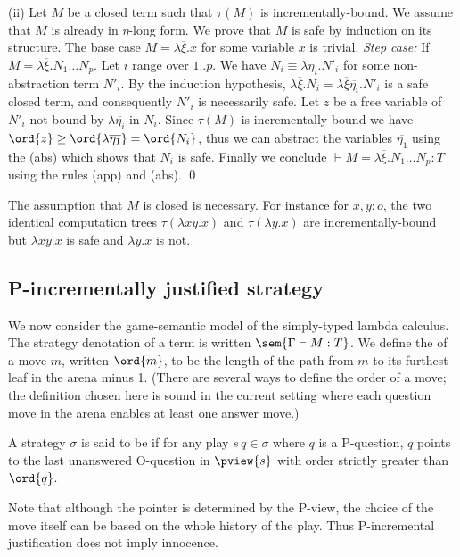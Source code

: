 (ii) Let $M$ be a closed term such that $\tau(M)$ is
incrementally-bound.  We assume that $M$ is already in $\eta$-long
form.  We prove that $M$ is safe by induction on its structure. The
base case $M = \lambda \overline{\xi} . x$ for some variable $x$ is
trivial.  \emph{Step case:} If $M = \lambda \overline{\xi} . N_1
\ldots N_p$.  Let $i$ range over $1..p$. We have $N_i \equiv \lambda
\overline{\eta_i} . N'_i$ for some non-abstraction term $N'_i$. By
the induction hypothesis, $\lambda \overline{\xi} . N_i = \lambda
\overline{\xi} \overline{\eta_i} . N'_i$ is a safe closed term, and
consequently $N'_i$ is necessarily safe. Let $z$ be a free variable
of $N'_i$ not bound by $\lambda \overline{\eta_i}$ in $N_i$. Since
$\tau(M)$ is incrementally-bound we have $\ord{z} \geq \ord{\lambda
  \overline{\eta_1}} = \ord{N_i}$, thus we can abstract the variables $\overline{\eta_1}$ using the {\sf (abs)} which shows that $N_i$ is safe.  Finally
we conclude $\vdash M = \lambda \overline{\xi} . N_1 \ldots N_p : T$
using the rules {\sf (app)} and {\sf (abs)}.  \qed



The assumption that $M$ is closed is necessary. For instance for
$x,y:o$, the two identical computation trees $\tau(\lambda x y .x)$
and $\tau(\lambda y . x)$ are incrementally-bound but $\lambda x y
.x$ is safe and $\lambda y . x$ is not.

\subsection*{P-incrementally justified strategy}

We now consider the game-semantic model of the simply-typed lambda
calculus. The strategy denotation of a term is written $\sem{\Gamma
\vdash M : T}$. We define the  of a move $m$, written
$\ord{m}$, to be the length of the path from $m$ to its furthest
leaf in the arena minus 1. (There are several ways to define the
order of a move; the definition chosen here is sound in the current
setting where each question move in the arena enables at least one
answer move.)

\begin{definition}\rm
  A strategy $\sigma$ is said to be  if for any play $s \, q \in \sigma$ where $q$ is a
  P-question, $q$ points to the last unanswered O-question in $\pview{s}$ with
  order strictly greater than $\ord{q}$.
\end{definition}
Note that although the pointer is determined by the P-view, the
choice of the move itself can be based on the whole history of the
play. Thus P-incremental justification does not imply innocence.


